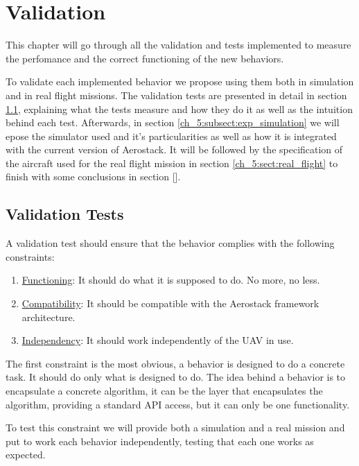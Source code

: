 \chapter{Validation}

  This chapter will go through all the validation and tests implemented to measure the perfomance and the correct functioning of the new behaviors. 

  To validate each implemented behavior we propose using them both in simulation and in real flight missions. The validation tests are presented in detail in section \ref{ch_5:sect:val_tests}, explaining what the tests measure and how they do it as well as the intuition behind each test. Afterwards, in section \ref{ch_5:subsect:exp_simulation} we will epose the simulator used and it's particularities as well as how it is integrated with the current version of Aerostack. It will be followed by the specification of the aircraft used for the real flight mission in section \ref{ch_5:sect:real_flight} to finish with some conclusions in section [].

\section{Validation Tests} \label{ch_5:sect:val_tests}

  A validation test should ensure that the behavior complies with the following constraints:

  \begin{enumerate}
    \item \underline{Functioning}: It should do what it is supposed to do. No more, no less.
    \item \underline{Compatibility}: It should be compatible with the Aerostack framework architecture.
    \item \underline{Independency}: It should work independently of the UAV in use.
  \end{enumerate}

  The first constraint is the most obvious, a behavior is designed to do a concrete task. It should do only what is designed to do. The idea behind a behavior is to encapsulate a concrete algorithm, it can be the layer that encapsulates the algorithm, providing a standard API access, but it can only be one functionality.

  To test this constraint we will provide both a simulation and a real mission and put to work each behavior independently, testing that each one works as expected.

